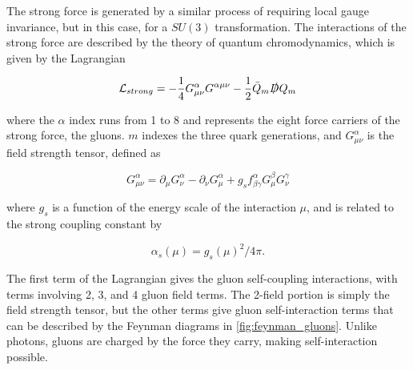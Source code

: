 The strong force is generated by a similar process of requiring local gauge invariance, but in this case, for a $SU(3)$ transformation. The interactions of the strong force are described by the theory of quantum chromodynamics, which is given by the Lagrangian

\begin{equation}
\mathcal{L}_{strong} = -\frac{1}{4}G^\alpha_{\mu\nu}G^{\alpha\mu\nu} - \frac{1}{2}\bar{Q}_m \slashed{D} Q_m
\end{equation}

where the $\alpha$ index runs from 1 to 8 and represents the eight force carriers of the strong force, the gluons. $m$ indexes the three quark generations, and $G^\alpha_{\mu\nu}$ is the field strength tensor, defined as

\begin{equation}
G^\alpha_{\mu\nu} = \partial_\mu G^\alpha_\nu - \partial_\nu G^\alpha_\mu + g_s f^\alpha_{\beta\gamma}G^\beta_\mu G^\gamma_\nu
\end{equation}

where $g_s$ is a function of the energy scale of the interaction $\mu$, and is related to the strong coupling constant by

\begin{equation}
\alpha_s(\mu) =  g_s(\mu)^2 / 4\pi . 
\end{equation}

The first term of the Lagrangian gives the gluon self-coupling interactions, with terms involving 2, 3, and 4 gluon field terms. The 2-field portion is simply the field strength tensor, but the other terms give gluon self-interaction terms that can be described by the Feynman diagrams in \autoref{fig:feynman_gluons}. Unlike photons, gluons are charged by the force they carry, making self-interaction possible. 

